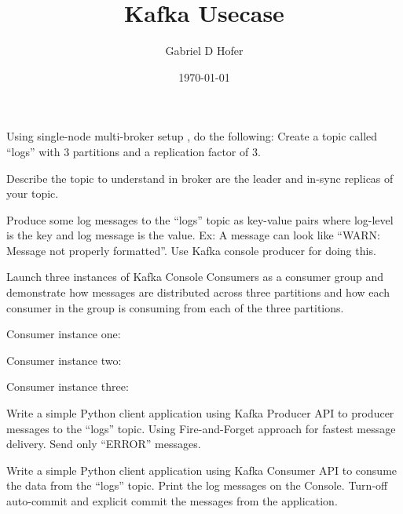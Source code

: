 \documentclass{article}
\title{Kafka Usecase}
\author{Gabriel D Hofer}
\date\today
\begin{document}
\maketitle
 
Using single-node multi-broker setup , do the following: 
Create a topic called “logs” with 3 partitions and a replication factor of 3. 


Describe the topic to understand in broker are the leader and in-sync replicas of your topic. 


Produce some log messages to the “logs” topic as key-value pairs where log-level is the key and log message is the value. Ex: A message can look like “WARN: Message not properly formatted”. Use Kafka console producer for doing this. 



Launch three instances of Kafka Console Consumers as a consumer group and demonstrate how messages are distributed across three partitions and how each consumer in the group is consuming from each of the three partitions.  

\noindent Consumer instance one:

Consumer instance two:

Consumer instance three:

 
\newpage

Write a simple Python client application using Kafka Producer API to producer messages to the “logs” topic.  Using Fire-and-Forget approach for fastest message delivery. Send only “ERROR” messages. 

 
Write a simple Python client application using Kafka Consumer API to consume the data from the “logs” topic. Print the log messages on the Console. Turn-off auto-commit and explicit commit the messages from the application.  

\end{document}
